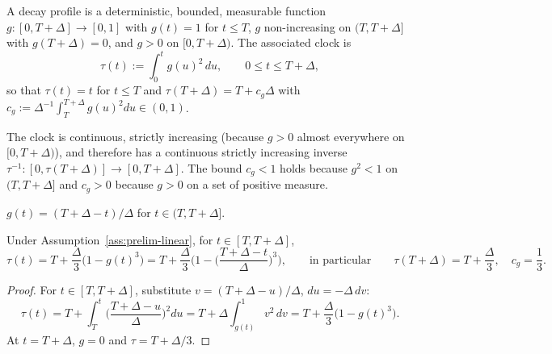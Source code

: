 \documentclass[../../../main.tex]{subfiles}
\begin{document}

\begin{definition}\label{def:prelim-decay}
A decay profile is a deterministic, bounded, measurable function $g:[0,T+\Delta]\to[0,1]$ with $g(t)=1$ for $t\le T$, $g$ non-increasing on $(T,T+\Delta]$ with $g(T+\Delta)=0$, and $g>0$ on $[0,T+\Delta)$. The associated clock is
\begin{equation}\label{eq:prelim-clock}
\tau(t):=\int_0^t g(u)^2\,du,\qquad 0\le t\le T+\Delta,
\end{equation}
so that $\tau(t)=t$ for $t\le T$ and $\tau(T+\Delta)=T+c_g\Delta$ with $c_g:=\Delta^{-1}\int_T^{T+\Delta}g(u)^2du\in(0,1)$.
\end{definition}

The clock is continuous, strictly increasing (because $g>0$ almost everywhere on $[0,T+\Delta)$), and therefore has a continuous strictly increasing inverse $\tau^{-1}:[0,\tau(T+\Delta)]\to[0,T+\Delta]$. The bound $c_g<1$ holds because $g^2<1$ on $(T,T+\Delta]$ and $c_g>0$ because $g>0$ on a set of positive measure.

\begin{assumption}\label{ass:prelim-linear}
$g(t)=(T+\Delta-t)/\Delta$ for $t\in(T,T+\Delta]$.
\end{assumption}

\begin{proposition}\label{prop:prelim-clock-linear}
Under Assumption~\ref{ass:prelim-linear}, for $t\in[T,T+\Delta]$,
\begin{equation}\label{eq:prelim-tau-linear}
\tau(t)=T+\frac{\Delta}{3}\Big(1-g(t)^3\Big)=T+\frac\Delta3\Big(1-\Big(\frac{T+\Delta-t}{\Delta}\Big)^3\Big),
\qquad\text{in particular}\qquad \tau(T+\Delta)=T+\frac\Delta3,\quad c_g=\frac13 .
\end{equation}
\end{proposition}

\begin{proof}
For $t\in[T,T+\Delta]$, substitute $v=(T+\Delta-u)/\Delta$, $du=-\Delta\,dv$:
\[
\tau(t)=T+\int_T^t\Big(\frac{T+\Delta-u}{\Delta}\Big)^2du=T+\Delta\int_{g(t)}^{1}v^2\,dv=T+\frac\Delta3\big(1-g(t)^3\big).
\]
At $t=T+\Delta$, $g=0$ and $\tau=T+\Delta/3$.
\end{proof}
\end{document}
